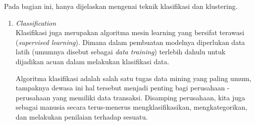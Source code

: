 Pada bagian ini, hanya dijelaskan mengenai teknik klasifikasi dan klustering.

\begin{enumerate}
	\item{\textit{Classification}\cite{book:339389}}\\
	Klasifikasi juga merupakan algoritma mesin learning yang bersifat terawasi (\textit{supervised learning}). Dimana dalam pembuatan modelnya diperlukan data latih (umumnya disebut sebagai \textit{data training}) terlebih dahulu untuk dijadikan acuan dalam melakukan klasifikasi data.
	
	Algoritma klasifikasi adalah salah satu tugas data mining yang paling umum, tampaknya dewasa ini hal tersebut menjadi penting bagi perusahaan - perusahaan yang memiliki data transaksi. Disamping perusahaan, kita juga sebagai manusia secara terus-menerus mengklasifikasikan, mengkategorikan, dan melakukan penilaian terhadap sesuatu. 
	

\end{enumerate}
